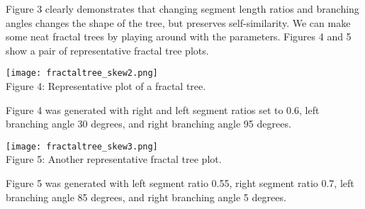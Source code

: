 \documentclass[12pt, letterpaper]{article}
\begin{document}
Figure 3 clearly demonstrates that changing segment length ratios and branching
angles changes the shape of the tree, but preserves self-similarity. We can make
some neat fractal trees by playing around with the parameters. Figures 4 and 5 
show a pair of representative fractal tree plots.

\begin{center}
\texttt{[image: fractaltree\_skew2.png]}
\\
Figure 4: Representative plot of a fractal tree.
\end{center}

Figure 4 was generated with right and left segment ratios set to 0.6, left 
branching angle 30 degrees, and right branching angle 95 degrees. 

\begin{center}
\texttt{[image: fractaltree\_skew3.png]}
\\
Figure 5: Another representative fractal tree plot.
\end{center}

Figure 5 was generated with left segment ratio 0.55, right segment ratio 0.7,
left branching angle 85 degrees, and right branching angle 5 degrees.
\end{document}
